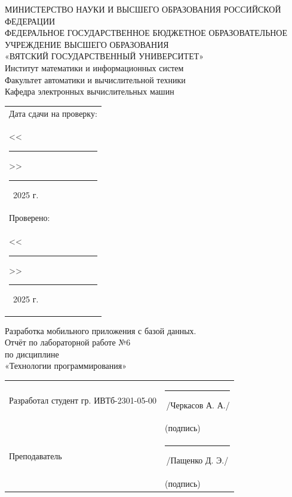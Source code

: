 \documentclass[oneside,a4paper,14pt]{extarticle}
\begin{document}
\newpage
\thispagestyle{empty}
\begin{center}
	МИНИСТЕРСТВО НАУКИ И ВЫСШЕГО ОБРАЗОВАНИЯ РОССИЙСКОЙ ФЕДЕРАЦИИ\\
	ФЕДЕРАЛЬНОЕ ГОСУДАРСТВЕННОЕ БЮДЖЕТНОЕ ОБРАЗОВАТЕЛЬНОЕ УЧРЕЖДЕНИЕ ВЫСШЕГО ОБРАЗОВАНИЯ\\[1mm]
	«ВЯТСКИЙ ГОСУДАРСТВЕННЫЙ УНИВЕРСИТЕТ»\\
	Институт математики и информационных систем\\
	Факультет автоматики и вычислительной техники\\
	Кафедра электронных вычислительных машин
\end{center}

\vspace{10mm}

\hfill
\begin{tabular}{l}
	\footnotesize Дата сдачи на проверку:                                          \\
	\footnotesize <<\rule[-1mm]{5mm}{0.10mm}\/>>\rule[-1mm]{20mm}{0.10mm}\ 2025 г. \\
	\footnotesize Проверено:                                                       \\
	\footnotesize <<\rule[-1mm]{5mm}{0.10mm}\/>>\rule[-1mm]{20mm}{0.10mm}\ 2025 г. \\
\end{tabular}

\vfill

\begin{center}
	Разработка мобильного приложения с базой данных.\\[1mm]
	Отчёт по лабораторной работе №6\\
	по дисциплине\\
	«Технологии программирования»\\
\end{center}

\vspace{25mm}

\noindent
\begin{tabular}{ll}
	Разработал студент гр. ИВТб-2301-05-00 & \hspace{18mm}\rule[-1mm]{30mm}{0.10mm}\,/Черкасов А. А./ \\
	                                       & \hspace{25.5mm}\footnotesize(подпись)                    \\
	Преподаватель                          & \hspace{18mm}\rule[-1mm]{30mm}{0.10mm}\,/Пащенко Д. Э./  \\
	                                       & \hspace{25.5mm}\footnotesize(подпись)                    \\
\end{tabular}
\end{document}
